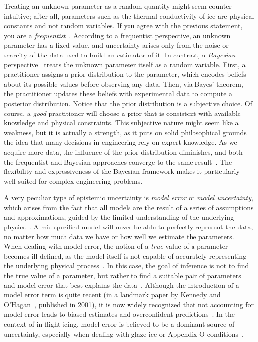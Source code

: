 \smallskip
Treating an unknown parameter as a random quantity might seem counter-intuitive; after all, parameters such as the thermal conductivity of ice are physical constants and not random variables. If you agree with the previous statement, you are a \textit{frequentist}~\cite{fisher1925}. According to a frequentist perspective, an unknown parameter has a fixed value, and uncertainty arises only from the noise or scarcity of the data used to build an estimator of it. In contrast, a \textit{Bayesian} perspective~\cite{bayes1763} treats the unknown parameter itself as a random variable. First, a practitioner assigns a prior distribution to the parameter, which encodes beliefs about its possible values before observing any data. Then, via Bayes' theorem, the practitioner updates these beliefs with experimental data to compute a posterior distribution. Notice that the prior distribution is a subjective choice. Of course, a \textit{good} practitioner will choose a prior that is consistent with available knowledge and physical constraints. This subjective nature might seem like a weakness, but it is actually a strength, as it puts on solid philosophical grounds the idea that many decisions in engineering rely on expert knowledge. As we acquire more data, the influence of the prior distribution diminishes, and both the frequentist and Bayesian approaches converge to the same result~\cite{uq_theory, Gelman2013}. The flexibility and expressiveness of the Bayesian framework makes it particularly well-suited for complex engineering problems.

\smallskip
A very peculiar type of epistemic uncertainty is \textit{model error} or \textit{model uncertainty}, which arises from the fact that all models are the result of a series of assumptions and approximations, guided by the limited understanding of the underlying physics~\cite{fmp}. A mis-specified model will never be able to perfectly represent the data, no matter how much data we have or how well we estimate the parameters. When dealing with model error, the notion of a \textit{true} value of a parameter becomes ill-defined, as the model itself is not capable of accurately representing the underlying physical process~\cite{Plumlee2017}. In this case, the goal of inference is not to find the true value of a parameter, but rather to find a suitable pair of parameters and model error that best explains the data~\cite{uq_theory}. Although the introduction of a model error term is quite recent (in a landmark paper by Kennedy and O'Hagan~\cite{koh2001}, published in 2001), it is now widely recognized that not accounting for model error leads to biased estimates and overconfident predictions~\cite{fmp, Plumlee2017, hagan_2014}. In the context of in-flight icing, model error is believed to be a dominant source of uncertainty, especially when dealing with glaze ice or Appendix-O conditions~\cite{Bellosta2021}.

